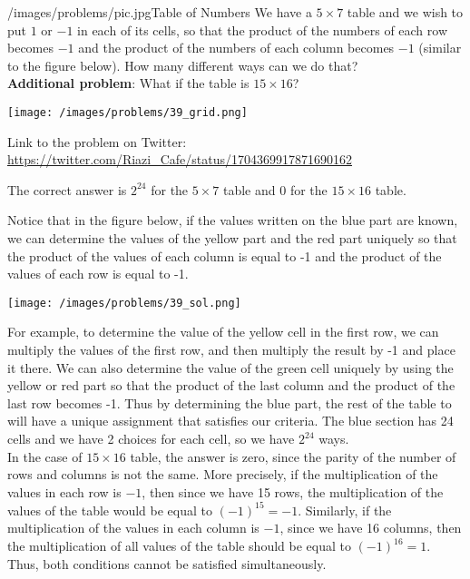 \begin{problem}{/images/problems/pic.jpg}{Table of Numbers}
	We have a $5 \times 7$ table and we wish to put $1$ or $-1$ in each of its cells, so that the product of the numbers of each row becomes $-1$ and the product of the numbers of each column becomes $-1$ (similar to the figure below). How many different ways can we do that?\\[0.2cm]

\textbf{Additional problem}: What if the table is $15 \times 16$?

\begin{center}
	\texttt{[image: /images/problems/39\_grid.png]}
\end{center}

Link to the problem on Twitter:  \url{https://twitter.com/Riazi_Cafe/status/1704369917871690162}
\end{problem}
\begin{solution}
The correct answer is $2^{24}$ for the $5 \times 7$ table and 0 for the $15 \times 16$ table.

Notice that in the figure below, if the values written on the blue part are known, we can determine the values of the yellow part and the red part uniquely so that the product of the values of each column is equal to -1 and the product of the values of each row is equal to -1.

\begin{center}
	\texttt{[image: /images/problems/39\_sol.png]}
\end{center}


For example, to determine the value of the yellow cell in the first row, we can multiply the values of the first row, and then multiply the result by -1 and place it there.
We can also determine the value of the green cell uniquely by using the yellow or red part so that the product of the last column and the product of the last row becomes -1. Thus by determining the blue part, the rest of the table to will have a unique assignment that satisfies our criteria. The blue section has 24 cells and we have 2 choices for each cell, so we have $2^{24}$ ways.\\[0.2cm]



In the case of  $15 \times 16$ table, the answer is zero, since the parity of the number of rows and columns is not the same. More precisely, if the multiplication of the values in each row is $-1$, then since we have 15 rows, the multiplication of the values of the table would be equal to $(-1)^{15} = -1$. Similarly, if the multiplication of the values in each column is $-1$, since we have 16 columns, then the multiplication of all values of the table should be equal to $(-1)^{16} = 1$. Thus, both conditions cannot be satisfied simultaneously.



\end{solution}